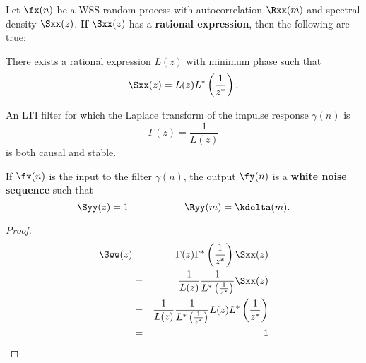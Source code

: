 \begin{theorem}
\label{thm:d-innovations}
Let $\fx(n)$ be a WSS random process with autocorrelation $\Rxx(m)$
and spectral density $\Sxx(z)$.
\textbf{If} $\Sxx(z)$ has a \textbf{rational expression},
then the following are true:

\begin{enume}
   \item There exists a rational expression $L(z)$ with minimum phase
         such that
         \[ \Sxx(z) = L(z)L^\ast\left(\frac{1}{z^\ast}\right). \]
   \item An LTI filter for which the Laplace transform of
         the impulse response $\gamma(n)$ is
         \[ \Gamma(z) = \frac{1}{L(z)} \]
         is both causal and stable.
   \item If $\fx(n)$ is the input to the filter $\gamma(n)$,
         the output $\fy(n)$ is a \textbf{white noise sequence} such that
         \[ \Syy(z)=1 \hspace{2cm} \Ryy(m)=\kdelta(m).\]
\end{enume}
\end{theorem}


\begin{proof}
\begin{eqnarray*}
   \Sww(z)
     &=& \Gamma(z)\Gamma^\ast\left(\frac{1}{z^\ast}\right) \Sxx(z)
   \\&=& \frac{1}{L(z)} \frac{1}{L^\ast\left(\frac{1}{z^\ast}\right)} \Sxx(z)
   \\&=& \frac{1}{L(z)} \frac{1}{L^\ast\left(\frac{1}{z^\ast}\right)}
         L(z) L^\ast\left(\frac{1}{z^\ast}\right)
   \\&=& 1
\end{eqnarray*}
\end{proof}








